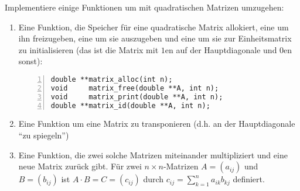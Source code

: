 \begin{aufg} Implementiere einige Funktionen um mit quadratischen Matrizen umzugehen:
\begin{enumerate}
\item Eine Funktion, die Speicher für eine quadratische Matrix allokiert, eine um ihn freizugeben, eine um sie auszugeben und eine um sie zur Einheitsmatrix zu initialisieren (das ist die Matrix mit $1$en auf der Hauptdiagonale und $0$en sonst):
\begin{codelisting}
\begin{lstlisting}[numbers=left,numberstyle=\tiny,frame=tlrb]
double **matrix_alloc(int n);
void     matrix_free(double **A, int n);
void     matrix_print(double **A, int n);
double **matrix_id(double **A, int n);
\end{lstlisting}
\end{codelisting}
\item Eine Funktion um eine Matrix zu transponieren (d.h. an der Hauptdiagonale ``zu spiegeln'')
\item Eine Funktion, die zwei solche Matrizen miteinander multipliziert und eine neue Matrix zurück gibt. Für zwei $n \times n$-Matrizen $A = (a_{ij})$ und $B = (b_{ij})$ ist $A \cdot B = C = (c_{ij})$ durch $c_{ij} = \sum_{k=1}^n a_{ik} b_{kj}$ definiert.
\end{enumerate}
\end{aufg}
